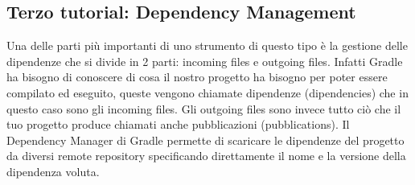 \subsection{Terzo tutorial: Dependency Management}
Una delle parti più importanti di uno strumento di questo tipo è la gestione delle dipendenze che si divide in 2 parti: incoming files e outgoing files. Infatti Gradle ha bisogno di conoscere di cosa il nostro progetto ha bisogno per poter essere compilato ed eseguito, queste vengono chiamate dipendenze (dipendencies) che in questo caso sono gli incoming files. Gli outgoing files sono invece tutto ciò che il tuo progetto produce chiamati anche pubblicazioni (pubblications). Il Dependency Manager di Gradle permette di scaricare le dipendenze del progetto da diversi remote repository specificando direttamente il nome e la versione della dipendenza voluta.

